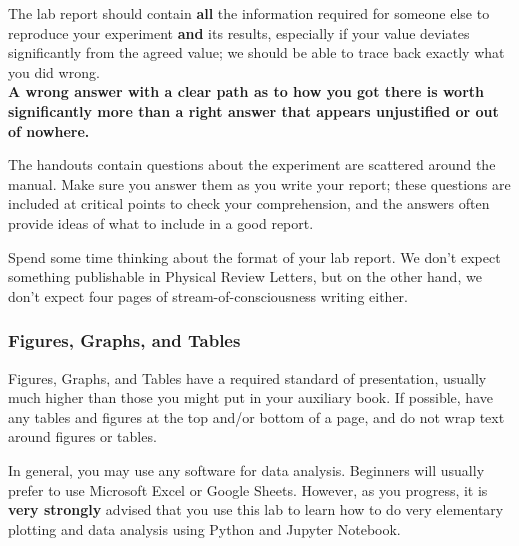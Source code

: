 \begin{imp}
The lab report should contain \textbf{all} the information required for someone else to reproduce your experiment \textbf{and} its results, especially if your value deviates significantly from the agreed value; we should be able to trace back exactly what you did wrong.~\\

\textbf{A wrong answer with a clear path as to how you got there is worth significantly more than a right answer that appears unjustified or out of nowhere. }
\end{imp}

The handouts contain questions about the experiment are scattered around the manual. Make sure you answer them as you write your report; these questions are included at critical points to check your comprehension, and the answers often provide ideas of what to include in a good report. 

\begin{imp}
Spend some time thinking about the format of your lab report. We don't expect something publishable in Physical Review Letters, but on the other hand, we don't expect four pages of stream-of-consciousness writing either.
\end{imp}

\subsubsection{Figures, Graphs, and Tables}

Figures, Graphs, and Tables have a required standard of presentation, usually much higher than those you might put in your auxiliary book. If possible, have any tables and figures at the top and/or bottom of a page, and do not wrap text around figures or tables.

\begin{imp}
In general, you may use any software for data analysis. Beginners will usually prefer to use Microsoft Excel or Google Sheets. However, as you progress, it is \textbf{very strongly} advised that you use this lab to learn how to do very elementary plotting and data analysis using Python and Jupyter Notebook.
\end{imp}

